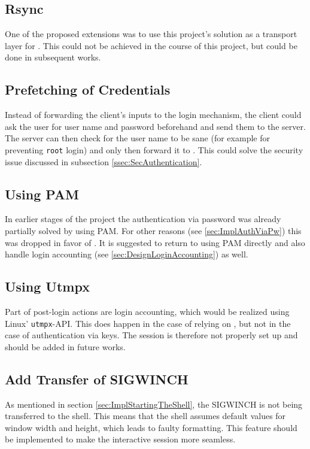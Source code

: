 \documentclass[10pt,a4paper,titlepage,twoside,english,final]{zhawreprt}
\begin{document}
\subsection{Rsync}\label{ssec:Rsync}
One of the proposed extensions was to use this project's solution as a transport layer for \cite{rsync}.
This could not be achieved in the course of this project, but could be done in subsequent works.

\subsection{Prefetching of Credentials}\label{ssec:PrefetchingOfCredentials}
Instead of forwarding the client's inputs to the \gls{login} mechanism, the client could ask the user for user name and password beforehand and send them to the server.
The server can then check for the user name to be sane (for example for preventing \texttt{root} login) and only then forward it to \cite{login}.
This could solve the security issue discussed in subsection \ref{ssec:SecAuthentication}.

\subsection{Using PAM}\label{ssec:UsingPAM}
In earlier stages of the project the authentication via password was already partially solved by using \gls{PAM}.
For other reasons (see \ref{sec:ImplAuthViaPw}) this was dropped in favor of \cite{login}.
It is suggested to return to using \gls{PAM} directly and also handle \gls{login} accounting (see \ref{sec:DesignLoginAccounting}) as well.

\subsection{Using Utmpx}\label{ssec:UsingUtmpx}
Part of post-\gls{login} actions are \gls{login} accounting, which would be realized using \gls{Linux}' \texttt{utmpx}-\gls{API}.
This does happen in the case of relying on \cite{login}, but not in the case of authentication via keys.
The session is therefore not properly set up and should be added in future works.

\subsection{Add Transfer of SIGWINCH}\label{ssec:AddTransferOfSIGWINCH}
As mentioned in section \ref{sec:ImplStartingTheShell}, the \gls{SIGWINCH} is not being transferred to the \gls{shell}.
This means that the \gls{shell} assumes default values for window width and height, which leads to faulty formatting.
This feature should be implemented to make the interactive session more seamless.
\end{document}

